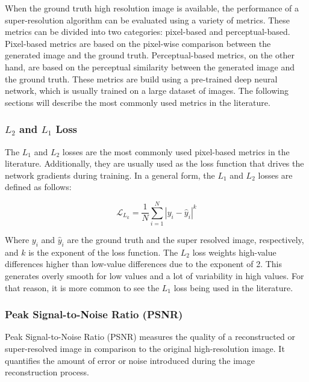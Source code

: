     When the ground truth high resolution image is available, the performance of a super-resolution algorithm can be evaluated using a variety of metrics. 
    These metrics can be divided into two categories: pixel-based and perceptual-based.
    Pixel-based metrics are based on the pixel-wise comparison between the generated image and the ground truth. 
    Perceptual-based metrics, on the other hand, are based on the perceptual similarity between the generated image and the ground truth. 
    These metrics are build using a pre-trained deep neural network, which is usually trained on a large dataset of images.
    The following sections will describe the most commonly used metrics in the literature.

        \subsubsection{$L_2$ and $L_1$ Loss}

            The $L_1$ and $L_2$ losses are the most commonly used pixel-based metrics in the literature. 
            Additionally, they are usually used as the loss function that drives the network gradients during training.
            In a general form, the $L_1$ and $L_2$ losses are defined as follows:

            \begin{equation}
                \mathcal{L}_{L_k} = \frac{1}{N} \sum_{i=1}^{N} |y_i - \hat{y}_i|^k
            \end{equation}

            Where $y_i$ and $\hat{y}_i$ are the ground truth and the super resolved image, respectively, and $k$ is the exponent of the loss function. 
            The $L_2$ loss weights high-value differences higher than low-value differences due to the exponent of 2. 
            This generates overly smooth for low values and a lot of variability in high values. 
            For that reason, it is more common to see the $L_1$ loss being used in the literature.

        \subsubsection{Peak Signal-to-Noise Ratio (PSNR)}

         
            Peak Signal-to-Noise Ratio (PSNR) measures the quality of a reconstructed or super-resolved image in comparison to the original high-resolution image. It quantifies the amount of error or noise introduced during the image reconstruction process.
            
